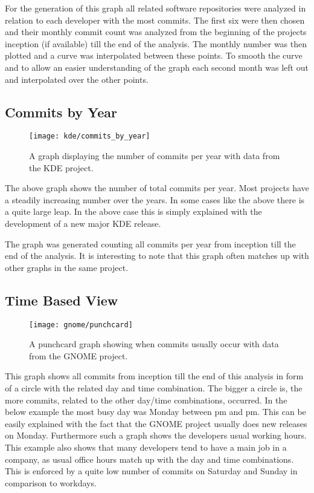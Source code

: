 For the generation of this graph all related software repositories were
analyzed in relation to each developer with the most commits. The first six
were then chosen and their monthly commit count was analyzed from the beginning
of the projects inception (if available) till the end of the analysis. The
monthly number was then plotted and a curve was interpolated between these
points. To smooth the curve and to allow an easier understanding of the graph
each second month was left out and interpolated over the other points.


\subsection{Commits by Year} %

\begin{figure}[h!t]
  \centering
  \texttt{[image: kde/commits\_by\_year]}
  \caption[The commits by year graph]
  {A graph displaying the number of commits per year with data from the KDE
    project.}
\end{figure}

The above graph shows the number of total commits per year. Most projects have
a steadily increasing number over the years. In some cases like the above there
is a quite large leap. In the above case this is simply explained with the
development of a new major KDE release.

The graph was generated counting all commits per year from inception till the
end of the analysis. It is interesting to note that this graph often matches up
with other graphs in the same project.


\subsection{Time Based View} %

\begin{figure}[h!t]
  \centering
  \texttt{[image: gnome/punchcard]}
  \caption[The time based view graph]
  {A punchcard graph showing when commits usually occur with data from the
    GNOME project.}
\end{figure}

This graph shows all commits from inception till the end of this analysis in
form of a circle with the related day and time combination. The bigger a circle
is, the more commits, related to the other day/time combinations, occurred. In
the below example the most busy day was Monday between \unit[4]{pm} and
\unit[12]{pm}. This can be easily explained with the fact that the GNOME
project usually does new releases on Monday. Furthermore such a graph shows the
developers usual working hours. This example also shows that many developers
tend to have a main job in a company, as usual office hours match up with the
day and time combinations. This is enforced by a quite low number of commits on
Saturday and Sunday in comparison to workdays.

